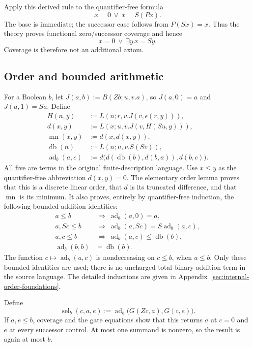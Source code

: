 Apply this derived rule to the quantifier-free formula
\[
                            x=0\ \vee\ x=S(Px).
\]
The base is immediate; the successor case follows from $P(Sx)=x$.
Thus the theory proves functional zero/successor coverage and hence
\[
                        x=0\ \vee\ \exists y\,x=Sy.
 \tag{Derived coverage}\label{eq:ib-coverage}
\]
Coverage is therefore not an additional axiom.

\subsection{Order and bounded arithmetic}

For a Boolean $b$, let $J(a,b):=B(Zb;u,v.a)$, so
$J(a,0)=a$ and $J(a,1)=Sa$.  Define
\begin{align*}
 H(n,y)&:=L(n;r,v.J(v,\epsilon(r,y))),\\
 d(x,y)&:=L(x;u,v.J(v,H(Su,y))),\\
 \operatorname{mn}(x,y)&:=d(x,d(x,y)),\\
 \operatorname{db}(n)&:=L(n;u,v.S(Sv)),\\
 \operatorname{ad}_b(a,c)&:=
 d\bigl(d(\operatorname{db}(b),d(b,a)),d(b,c)\bigr).
\end{align*}
All five are terms in the original finite-description language.
Use $x\leq y$ as the quantifier-free abbreviation $d(x,y)=0$.
The elementary order lemma proves that this is a discrete linear order,
that $d$ is its truncated difference, and that $\operatorname{mn}$
is its minimum.  It also proves, entirely by quantifier-free induction,
the following bounded-addition identities:
\begin{align}
 a\leq b&\ \Longrightarrow\ \operatorname{ad}_b(a,0)=a,
 \label{eq:ib-add0}\\
 a,Sc\leq b&\ \Longrightarrow\
 \operatorname{ad}_b(a,Sc)=S\operatorname{ad}_b(a,c),
 \label{eq:ib-addS}\\
 a,c\leq b&\ \Longrightarrow\
 \operatorname{ad}_b(a,c)\leq\operatorname{db}(b),
 \label{eq:ib-addbound}\\
 \operatorname{ad}_b(b,b)&=\operatorname{db}(b).
 \label{eq:ib-adddiag}
\end{align}
The function $c\mapsto\operatorname{ad}_b(a,c)$ is nondecreasing on
$c\leq b$, when $a\leq b$.  Only these bounded identities are used;
there is no uncharged total binary addition term in the source language.
The detailed inductions are given in Appendix~\ref{sec:internal-order-foundations}.

Define
\[
 \operatorname{sel}_b(c,a,e):=
 \operatorname{ad}_b\bigl(G(Zc,a),G(c,e)\bigr).
\]
If $a,e\leq b$, coverage and the gate equations show that this returns
$a$ at $c=0$ and $e$ at every successor control.  At most one summand
is nonzero, so the result is again at most $b$.

